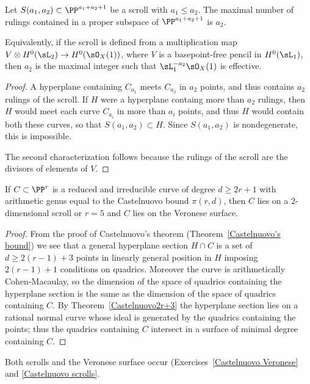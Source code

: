 \begin{proposition}\label{which scroll}
Let $S(a_1,a_2)\subset \PP^{a_1+a_2+1}$ be a scroll with $a_1\leq a_2$. The maximal number of rulings contained in
a proper subspace of $ \PP^{a_1+a_2+1}$ is $a_2$. 

Equivalently, if the scroll is defined from a multiplication
map $V\otimes H^0(\sL_2) \to H^0(\sO_X(1))$, where $V$ is a basepoint-free pencil in $H^0(\sL_1)$,
then $a_2$ is the maximal integer such that $\sL_1^{-a_2}\sO_X(1)$ is effective.
\end{proposition}

\begin{proof}
A hyperplane containing $C_{a_1}$ meets $C_{a_2}$ in $a_2$
points, and thus contains $a_2$ rulings of the scroll. If $H$ were a hyperplane containg more than $a_2$
rulings, then $H$ would meet each curve $C_{a_i}$ in more than $a_i$ points, and thus $H$ would contain
both these curves, so that $S(a_1,a_2)\subset H$. Since $S(a_1,a_2)$ is nondegenerate, this is impossible.

The second characterization follows because the rulings of the scroll are the divisors of elements of $V.$
\end{proof}



\begin{theorem}\label{Castelnuovo examples}
If $C\subset \PP^r$ is a reduced and irreducible curve of degree $d\geq 2r+1$ with arithmetic genus equal to
the
Castelnuovo bound $\pi(r,d)$, then $C$ lies on a 2-dimensional scroll or $r=5$ and $C$ lies on  the Veronese surface.
\end{theorem}

\begin{proof}
From the proof of Castelnuovo's theorem (Theorem~\ref{Castelnuovo's bound}) we see that a general hyperplane
section $H\cap C$ is a set of $d\geq 2(r-1)+3$ points in linearly general position in $H$ imposing $2(r-1)+1$ conditions on quadrics. Moreover the curve
is arithmetically Cohen-Macaulay, so the dimension of the space of quadrics containing the hyperplane section
is the same as the dimension of the space of quadrics containing $C$. By Theorem~\ref{Castelnuovo2r+3} the hyperplane
section lies on a rational normal curve whose ideal is generated by the quadrics containing the points;
thus the quadrics containing $C$ intersect in a surface of minimal degree containing $C$.
\end{proof}

Both scrolls and the Veronese surface occur (Exercises~\ref{Castelnuovo Veronese} and \ref{Castelnuovo scrolls}.

